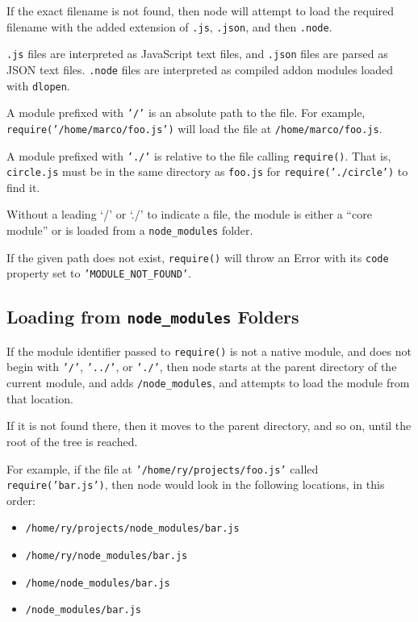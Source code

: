 If the exact filename is not found, then node will attempt to load the
required filename with the added extension of \texttt{.js},
\texttt{.json}, and then \texttt{.node}.

\texttt{.js} files are interpreted as JavaScript text files, and
\texttt{.json} files are parsed as JSON text files. \texttt{.node} files
are interpreted as compiled addon modules loaded with \texttt{dlopen}.

A module prefixed with \texttt{'/'} is an absolute path to the file. For
example, \texttt{require('/home/marco/foo.js')} will load the file at
\texttt{/home/marco/foo.js}.

A module prefixed with \texttt{'./'} is relative to the file calling
\texttt{require()}. That is, \texttt{circle.js} must be in the same
directory as \texttt{foo.js} for \texttt{require('./circle')} to find
it.

Without a leading `/' or `./' to indicate a file, the module is either a
``core module'' or is loaded from a \texttt{node\_modules} folder.

If the given path does not exist, \texttt{require()} will throw an Error
with its \texttt{code} property set to \texttt{'MODULE\_NOT\_FOUND'}.

\subsection{Loading from \texttt{node\_modules}
Folders}\label{loading-from-nodeux5fmodules-folders}

If the module identifier passed to \texttt{require()} is not a native
module, and does not begin with \texttt{'/'}, \texttt{'../'}, or
\texttt{'./'}, then node starts at the parent directory of the current
module, and adds \texttt{/node\_modules}, and attempts to load the
module from that location.

If it is not found there, then it moves to the parent directory, and so
on, until the root of the tree is reached.

For example, if the file at \texttt{'/home/ry/projects/foo.js'} called
\texttt{require('bar.js')}, then node would look in the following
locations, in this order:

\begin{itemize}
\itemsep1pt\parskip0pt
\item
  \texttt{/home/ry/projects/node\_modules/bar.js}
\item
  \texttt{/home/ry/node\_modules/bar.js}
\item
  \texttt{/home/node\_modules/bar.js}
\item
  \texttt{/node\_modules/bar.js}
\end{itemize}

